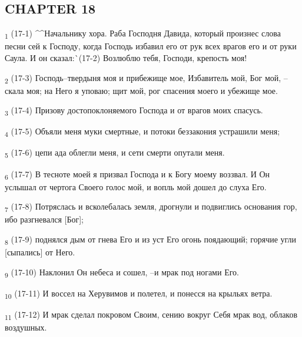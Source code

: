 \subsection{CHAPTER 18}
\begin{tcolorbox}
\textsubscript{1} (17-1) ^^Начальнику хора. Раба Господня Давида, который произнес слова песни сей к Господу, когда Господь избавил его от рук всех врагов его и от руки Саула. И он сказал:^^ (17-2) Возлюблю тебя, Господи, крепость моя!
\end{tcolorbox}
\begin{tcolorbox}
\textsubscript{2} (17-3) Господь--твердыня моя и прибежище мое, Избавитель мой, Бог мой, --скала моя; на Него я уповаю; щит мой, рог спасения моего и убежище мое.
\end{tcolorbox}
\begin{tcolorbox}
\textsubscript{3} (17-4) Призову достопоклоняемого Господа и от врагов моих спасусь.
\end{tcolorbox}
\begin{tcolorbox}
\textsubscript{4} (17-5) Объяли меня муки смертные, и потоки беззакония устрашили меня;
\end{tcolorbox}
\begin{tcolorbox}
\textsubscript{5} (17-6) цепи ада облегли меня, и сети смерти опутали меня.
\end{tcolorbox}
\begin{tcolorbox}
\textsubscript{6} (17-7) В тесноте моей я призвал Господа и к Богу моему воззвал. И Он услышал от чертога Своего голос мой, и вопль мой дошел до слуха Его.
\end{tcolorbox}
\begin{tcolorbox}
\textsubscript{7} (17-8) Потряслась и всколебалась земля, дрогнули и подвиглись основания гор, ибо разгневался [Бог];
\end{tcolorbox}
\begin{tcolorbox}
\textsubscript{8} (17-9) поднялся дым от гнева Его и из уст Его огонь поядающий; горячие угли [сыпались] от Него.
\end{tcolorbox}
\begin{tcolorbox}
\textsubscript{9} (17-10) Наклонил Он небеса и сошел, --и мрак под ногами Его.
\end{tcolorbox}
\begin{tcolorbox}
\textsubscript{10} (17-11) И воссел на Херувимов и полетел, и понесся на крыльях ветра.
\end{tcolorbox}
\begin{tcolorbox}
\textsubscript{11} (17-12) И мрак сделал покровом Своим, сению вокруг Себя мрак вод, облаков воздушных.
\end{tcolorbox}
